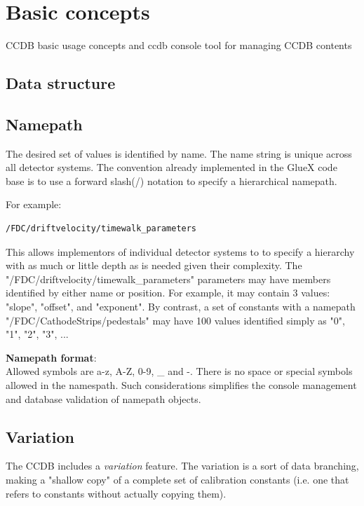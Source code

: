 \documentclass{article}
\begin{document}
\newpage
\section{Basic concepts}\label{sec:basic_concepts}

CCDB basic usage concepts and ccdb console tool for managing CCDB contents


\subsection{Data structure}


\subsection{Namepath}
The desired set of values is identified by name. The name string is unique 
across all detector systems. The convention already implemented in the GlueX 
code base is to use a forward slash(/) notation to specify a hierarchical 
namepath. 

For example:
\begin{verbatim}
/FDC/driftvelocity/timewalk_parameters
\end{verbatim}

This allows implementors of individual detector systems to to specify a 
hierarchy with as much or little depth as is needed given their complexity.
The "/FDC/driftvelocity/timewalk\_parameters" parameters may have members 
identified by either name or position. For example, it may contain 3 values: 
"slope", "offset", and "exponent". By contrast, a set of constants with a 
namepath "/FDC/CathodeStrips/pedestals" may have 100 values identified simply 
as "0", "1", "2", "3", ...

\textbf{Namepath format}:\\
Allowed symbols are a-z, A-Z, 0-9, \_ and -. There is no space or special symbols
allowed in the namespath. Such considerations simplifies the console management
and database validation of namepath objects.


\subsection{Variation}
The CCDB includes a \textit{variation} feature. The variation is a sort 
of data branching, making a "shallow copy" of a complete set of calibration 
constants (i.e. one that refers to constants without actually copying them). 
\end{document}

